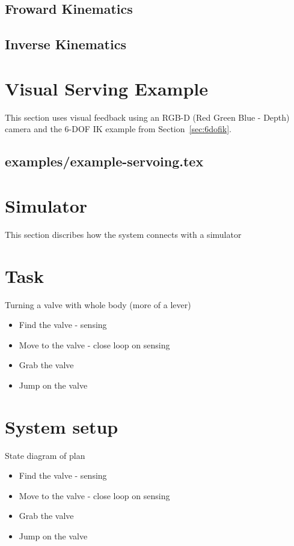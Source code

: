 	\subsection{Froward Kinematics} 
		
	\subsection{Inverse Kinematics}
			
			
\section{Visual Serving Example}
This section uses visual feedback using an RGB-D (Red Green Blue - Depth) camera and the 6-DOF IK example from Section~\ref{sec:6dofik}.
	\subsection{examples/example-servoing.tex}












\section{Simulator}\label{sec:simulator}
This section discribes how the system connects with a simulator 


\section{Task}\label{sec:task}
Turning a valve with whole body (more of a lever)
\begin{itemize}
\item Find the valve - sensing
\item Move to the valve - close loop on sensing
\item Grab the valve
\item Jump on the valve
\end{itemize}



\section{System setup}

State diagram of plan
\begin{itemize}
\item Find the valve - sensing
\item Move to the valve - close loop on sensing
\item Grab the valve
\item Jump on the valve
\end{itemize}

